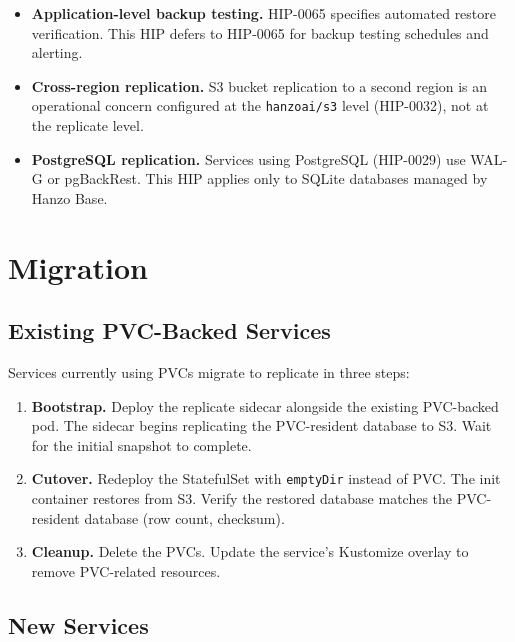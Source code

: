 \documentclass[11pt]{article}
\begin{document}
\begin{itemize}[nosep]
    \item \textbf{Application-level backup testing.} HIP-0065 specifies
    automated restore verification. This HIP defers to HIP-0065 for backup
    testing schedules and alerting.

    \item \textbf{Cross-region replication.} S3 bucket replication to a
    second region is an operational concern configured at the
    \texttt{hanzoai/s3} level (HIP-0032), not at the replicate level.

    \item \textbf{PostgreSQL replication.} Services using PostgreSQL
    (HIP-0029) use WAL-G or pgBackRest. This HIP applies only to SQLite
    databases managed by Hanzo Base.
\end{itemize}

\section{Migration}

\subsection{Existing PVC-Backed Services}

Services currently using PVCs migrate to replicate in three steps:

\begin{enumerate}[nosep]
    \item \textbf{Bootstrap.} Deploy the replicate sidecar alongside the
    existing PVC-backed pod. The sidecar begins replicating the PVC-resident
    database to S3. Wait for the initial snapshot to complete.

    \item \textbf{Cutover.} Redeploy the StatefulSet with \texttt{emptyDir}
    instead of PVC. The init container restores from S3. Verify the restored
    database matches the PVC-resident database (row count, checksum).

    \item \textbf{Cleanup.} Delete the PVCs. Update the service's Kustomize
    overlay to remove PVC-related resources.
\end{enumerate}

\subsection{New Services}
\end{document}
